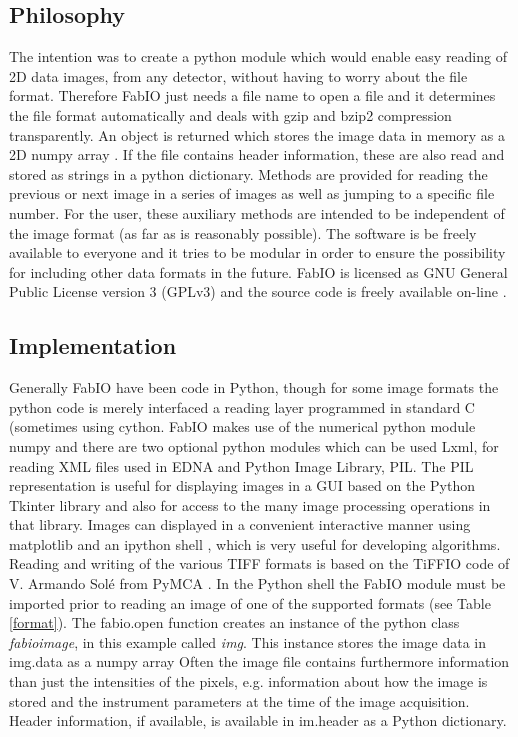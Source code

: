 \documentclass{iucr}
\begin{document}
\subsection{Philosophy}

The intention was to create a python module which would enable easy reading
of 2D data images, from any detector, without having to worry about
the file format.
Therefore FabIO just needs a file name to open a file and it determines the
file format automatically and deals with gzip \cite{gzip} and bzip2
\cite{bzip2} compression transparently.
An object is returned which stores the image data in memory as a 2D
numpy array \cite{numpy}.
If the file contains header information, these are also read and stored
as strings in a python dictionary.
Methods are provided for reading the previous or next image in
a series of images as well as jumping to a specific file number.
For the user, these auxiliary methods are intended to be independent of
the image format (as far as is reasonably possible).
The software is be freely available to everyone and it tries to be
modular in order to ensure the possibility for including other data formats
in the future.
FabIO is licensed as GNU General Public License version 3 (GPLv3) and the
source code is freely available on-line \cite{fabio}.

\subsection{Implementation}

Generally FabIO have been code in Python\cite{python},
though for some image formats the python code is merely interfaced a reading
layer programmed in standard C (sometimes using cython\cite{cython}.
FabIO makes use of the numerical python module numpy\cite{numpy} and there are
two optional python modules which can be used Lxml, for reading XML files
used in EDNA\cite{edna} and Python Image Library, PIL\cite{pil}.
The PIL representation is useful for displaying images in a GUI based on
the Python Tkinter library\cite{tkinter} and also for access
to the many image processing operations in that library.
Images can displayed in a convenient interactive manner using
matplotlib\cite{matplotlib} and an ipython shell \cite{ipython}, which is
very useful for developing algorithms.
Reading and writing of the various TIFF \cite{tiff} formats is based on the
TiFFIO code of V. Armando Sol\'e from PyMCA \cite{pymca}.
In the Python shell the FabIO module must be imported prior to reading an
image of one of the supported formats (see Table \ref{format}).
The fabio.open function creates an instance of the python class {\em fabioimage},
in this example called {\em img}.
This instance stores the image data in img.data as a numpy array
Often the image file contains furthermore information than just
the intensities of the pixels, e.g. information about how the image is
stored and the instrument parameters at the time of the image acquisition.
Header information, if available, is available in im.header as a Python
dictionary.
\end{document}
